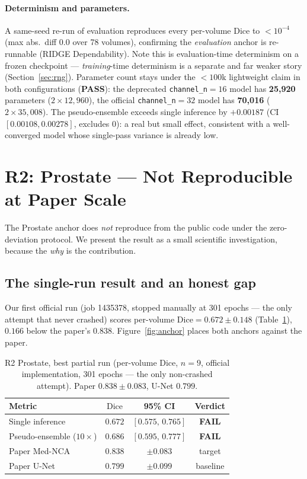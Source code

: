 \documentclass[10pt,twocolumn]{article}
\newcommand{\pass}{\textcolor{passgreen}{\textbf{PASS}}}
\newcommand{\fail}{\textcolor{failamber}{\textbf{FAIL}}}
\newcommand{\dice}{\mathrm{Dice}}
\begin{document}
\paragraph{Determinism and parameters.}
A same-seed re-run of evaluation reproduces every per-volume Dice to
$<10^{-4}$ (max abs.\ diff $0.0$ over 78 volumes), confirming the
\emph{evaluation} anchor is re-runnable (RIDGE Dependability). Note this is
evaluation-time determinism on a frozen checkpoint --- \emph{training}-time
determinism is a separate and far weaker story (Section~\ref{sec:rng}).
Parameter count stays under the $<100$k lightweight claim in both
configurations (\pass): the deprecated \texttt{channel\_n}$=16$ model has
\textbf{25{,}920} parameters ($2\times12{,}960$), the official
\texttt{channel\_n}$=32$ model has \textbf{70{,}016} ($2\times35{,}008$).
The pseudo-ensemble exceeds single inference by $+0.00187$
(CI $[0.00108,0.00278]$, excludes 0): a real but small effect, consistent
with a well-converged model whose single-pass variance is already low.

\section{R2: Prostate --- Not Reproducible at Paper Scale}
\label{sec:r2}

The Prostate anchor does \emph{not} reproduce from the public code under
the zero-deviation protocol. We present the result as a small scientific
investigation, because the \emph{why} is the contribution.

\subsection{The single-run result and an honest gap}

Our first official run (job 1435378, stopped manually at 301 epochs ---
the only attempt that never crashed) scores per-volume
$\dice=0.672 \pm 0.148$ (Table~\ref{tab:r2}), $0.166$ below the paper's
$0.838$. Figure~\ref{fig:anchor} places both anchors against the paper.

\begin{table}[t]
\centering\small
\caption{R2 Prostate, best partial run (per-volume Dice, $n=9$, official
implementation, 301 epochs --- the only non-crashed attempt). Paper
$0.838\pm0.083$, U-Net $0.799$.}
\label{tab:r2}
\begin{tabular}{lccc}
\toprule
Metric & $\dice$ & 95\% CI & Verdict\\
\midrule
Single inference   & $0.672$ & $[0.575,\,0.765]$ & \fail\\
Pseudo-ensemble ($10\times$) & $0.686$ & $[0.595,\,0.777]$ & \fail\\
\midrule
Paper Med-NCA & $0.838$ & $\pm0.083$ & target\\
Paper U-Net   & $0.799$ & $\pm0.099$ & baseline\\
\bottomrule
\end{tabular}
\end{table}
\end{document}
